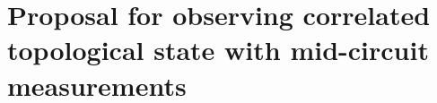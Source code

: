 \documentclass[longbibliography, aps, prx, amsmath, amssymb, amsfonts, twocolumn,superscriptaddress, footinbib]{revtex4-1}
\begin{document}
	\section{Proposal for observing correlated topological state with mid-circuit measurements}
\end{document}
